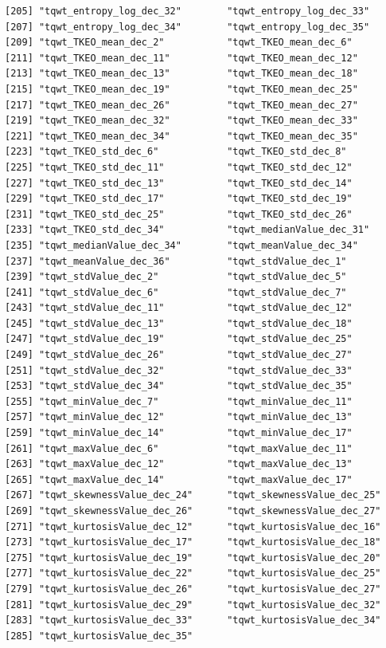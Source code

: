 \documentclass[
]{article}
\begin{document}
\begin{verbatim}
[205] "tqwt_entropy_log_dec_32"        "tqwt_entropy_log_dec_33"       
[207] "tqwt_entropy_log_dec_34"        "tqwt_entropy_log_dec_35"       
[209] "tqwt_TKEO_mean_dec_2"           "tqwt_TKEO_mean_dec_6"          
[211] "tqwt_TKEO_mean_dec_11"          "tqwt_TKEO_mean_dec_12"         
[213] "tqwt_TKEO_mean_dec_13"          "tqwt_TKEO_mean_dec_18"         
[215] "tqwt_TKEO_mean_dec_19"          "tqwt_TKEO_mean_dec_25"         
[217] "tqwt_TKEO_mean_dec_26"          "tqwt_TKEO_mean_dec_27"         
[219] "tqwt_TKEO_mean_dec_32"          "tqwt_TKEO_mean_dec_33"         
[221] "tqwt_TKEO_mean_dec_34"          "tqwt_TKEO_mean_dec_35"         
[223] "tqwt_TKEO_std_dec_6"            "tqwt_TKEO_std_dec_8"           
[225] "tqwt_TKEO_std_dec_11"           "tqwt_TKEO_std_dec_12"          
[227] "tqwt_TKEO_std_dec_13"           "tqwt_TKEO_std_dec_14"          
[229] "tqwt_TKEO_std_dec_17"           "tqwt_TKEO_std_dec_19"          
[231] "tqwt_TKEO_std_dec_25"           "tqwt_TKEO_std_dec_26"          
[233] "tqwt_TKEO_std_dec_34"           "tqwt_medianValue_dec_31"       
[235] "tqwt_medianValue_dec_34"        "tqwt_meanValue_dec_34"         
[237] "tqwt_meanValue_dec_36"          "tqwt_stdValue_dec_1"           
[239] "tqwt_stdValue_dec_2"            "tqwt_stdValue_dec_5"           
[241] "tqwt_stdValue_dec_6"            "tqwt_stdValue_dec_7"           
[243] "tqwt_stdValue_dec_11"           "tqwt_stdValue_dec_12"          
[245] "tqwt_stdValue_dec_13"           "tqwt_stdValue_dec_18"          
[247] "tqwt_stdValue_dec_19"           "tqwt_stdValue_dec_25"          
[249] "tqwt_stdValue_dec_26"           "tqwt_stdValue_dec_27"          
[251] "tqwt_stdValue_dec_32"           "tqwt_stdValue_dec_33"          
[253] "tqwt_stdValue_dec_34"           "tqwt_stdValue_dec_35"          
[255] "tqwt_minValue_dec_7"            "tqwt_minValue_dec_11"          
[257] "tqwt_minValue_dec_12"           "tqwt_minValue_dec_13"          
[259] "tqwt_minValue_dec_14"           "tqwt_minValue_dec_17"          
[261] "tqwt_maxValue_dec_6"            "tqwt_maxValue_dec_11"          
[263] "tqwt_maxValue_dec_12"           "tqwt_maxValue_dec_13"          
[265] "tqwt_maxValue_dec_14"           "tqwt_maxValue_dec_17"          
[267] "tqwt_skewnessValue_dec_24"      "tqwt_skewnessValue_dec_25"     
[269] "tqwt_skewnessValue_dec_26"      "tqwt_skewnessValue_dec_27"     
[271] "tqwt_kurtosisValue_dec_12"      "tqwt_kurtosisValue_dec_16"     
[273] "tqwt_kurtosisValue_dec_17"      "tqwt_kurtosisValue_dec_18"     
[275] "tqwt_kurtosisValue_dec_19"      "tqwt_kurtosisValue_dec_20"     
[277] "tqwt_kurtosisValue_dec_22"      "tqwt_kurtosisValue_dec_25"     
[279] "tqwt_kurtosisValue_dec_26"      "tqwt_kurtosisValue_dec_27"     
[281] "tqwt_kurtosisValue_dec_29"      "tqwt_kurtosisValue_dec_32"     
[283] "tqwt_kurtosisValue_dec_33"      "tqwt_kurtosisValue_dec_34"     
[285] "tqwt_kurtosisValue_dec_35"     
\end{verbatim}
\end{document}
